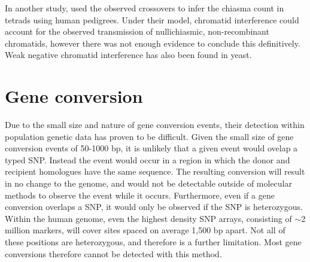 In another study, \citet{Fledel-Alon2009} used the observed crossovers to infer the chiasma count in tetrads using human pedigrees.
Under their model, chromatid interference could account for the observed transmission of nullichiasmic, non-recombinant chromatids, however there was not enough evidence to conclude this definitively.
Weak negative chromatid interference has also been found in yeast\cite{Zhao1995a}.



\section{Gene conversion}






Due to the small size and nature of gene conversion events, their detection within population genetic data has proven to be difficult.
Given the small size of gene conversion events of 50-1000 bp, it is unlikely that a given event would ovelap a typed SNP.
Instead the event would occur in a region in which the donor and recipient homologues have the same sequence.
The resulting conversion will result in no change to the genome, and would not be detectable outside of molecular methods to observe the event while it occurs.
Furthermore, even if a gene conversion overlaps a SNP, it would only be observed if the SNP is heterozygous.
Within the human genome, even the highest density SNP arrays, consisting of $\sim$2 million markers, will cover sites spaced on average 1,500 bp apart.
Not all of these positions are heterozygous, and therefore is a further limitation.
Most gene conversions therefore cannot be detected with this method.

